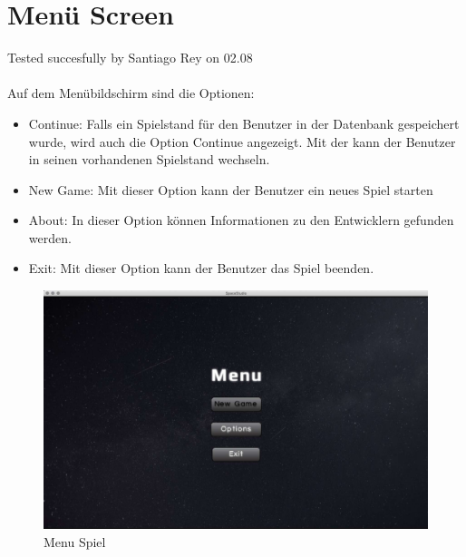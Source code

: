 \documentclass[12pt]{article}
\begin{document}
\section{Menü Screen}
Tested succesfully by Santiago Rey on 02.08\\\\
Auf dem Menübildschirm sind die Optionen:
\begin{itemize}
\item Continue: Falls ein Spielstand für den Benutzer in der Datenbank gespeichert wurde, wird auch die Option Continue angezeigt. Mit der kann der Benutzer in seinen vorhandenen Spielstand wechseln.
\item New Game: Mit dieser Option kann der Benutzer ein neues Spiel starten
\item About: In dieser Option können Informationen zu den Entwicklern gefunden werden.
\item Exit: Mit dieser Option kann der Benutzer das Spiel beenden.
\end{itemize}
\begin{figure}[htp]
\centering
\includegraphics[scale=0.4]{TestProtocolBilder/menuScreen.jpg}
\caption{Menu Spiel}
\end{figure}
\newpage
\end{document}
